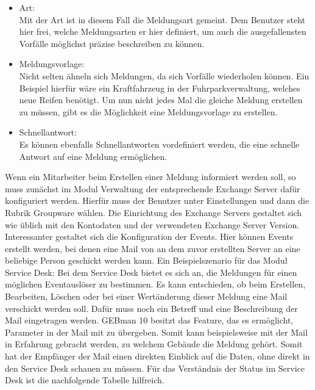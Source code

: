 \begin{itemize}
\item Art:\\
		Mit der Art ist in diesem Fall die Meldungsart gemeint. Dem Benutzer steht hier frei, welche 
		Meldungsarten er hier definiert, um auch die ausgefallensten Vorfälle möglichst präzise beschreiben zu 
		können.   \\
		 
\item Meldungsvorlage:\\
		Nicht selten ähneln sich Meldungen, da sich Vorfälle wiederholen können. Ein Beispiel hierfür wäre ein 
		Kraftfahrzeug in der Fuhrparkverwaltung, welches neue Reifen benötigt. Um nun nicht jedes Mal die 
		gleiche Meldung erstellen zu müssen, gibt es die Möglichkeit eine Meldungsvorlage zu erstellen. \\
		
\item Schnellantwort:\\
		Es können ebenfalls Schnellantworten vordefiniert werden, die eine schnelle Antwort auf eine Meldung 
		ermöglichen.\\		
\end{itemize}

\noindent
Wenn ein Mitarbeiter beim Erstellen einer Meldung informiert werden soll, so muss zunächst im Modul Verwaltung der entsprechende Exchange Server dafür konfiguriert werden. Hierfür muss der Benutzer unter Einstellungen und dann die Rubrik Groupware wählen. Die Einrichtung des Exchange Servers gestaltet sich wie üblich mit den Kontodaten und der verwendeten Exchange Server Version.\newline
Interessanter gestaltet sich die Konfiguration der Events. Hier können Events erstellt werden, bei denen eine Mail von an dem zuvor erstellten Server an eine beliebige Person geschickt werden kann. Ein Beispielszenario für das Modul Service Desk:\newline
Bei dem Service Desk bietet es sich an, die Meldungen für einen möglichen Eventauslöser zu bestimmen. Es kann entschieden, ob beim Erstellen, Bearbeiten, Löschen oder bei einer Wertänderung dieser Meldung eine Mail verschickt werden soll. Dafür muss noch ein Betreff und eine Beschreibung der Mail eingetragen werden. GEBman 10 besitzt das Feature, das es ermöglicht, Parameter in der Mail mit zu übergeben. Somit kann beispielsweise mit der Mail in Erfahrung gebracht werden, zu welchem Gebäude die Meldung gehört. Somit hat der Empfänger der Mail einen direkten Einblick auf die Daten, ohne direkt in den Service Desk schauen zu müssen.\newline
Für das Verständnis der Status im Service Desk ist die nachfolgende Tabelle hilfreich.

